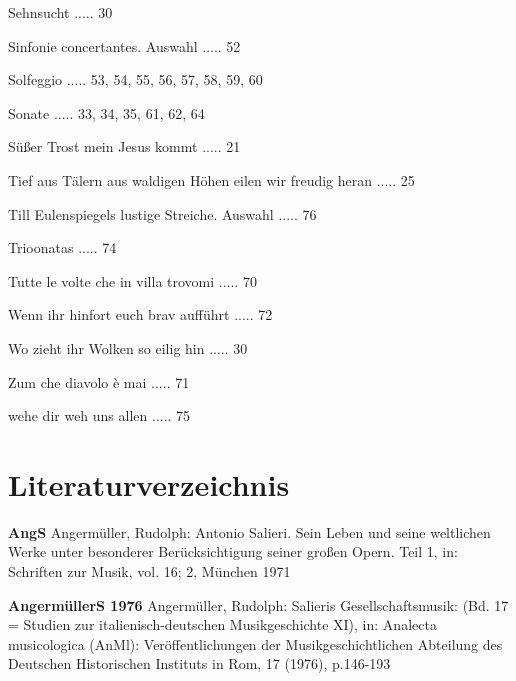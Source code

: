 \documentclass[a4paper, twocolumn, 11pt]{book}
\begin{document}
\newline 
Sehnsucht ..... 30

\newline 
Sinfonie concertantes. Auswahl ..... 52

\newline 
Solfeggio ..... 53, 54, 55, 56, 57, 58, 59, 60

\newline 
Sonate ..... 33, 34, 35, 61, 62, 64

\newline 
Süßer Trost mein Jesus kommt ..... 21

\newline 
Tief aus Tälern aus waldigen Höhen eilen wir freudig heran ..... 25

\newline 
Till Eulenspiegels lustige Streiche. Auswahl ..... 76

\newline 
Trioonatas ..... 74

\newline 
Tutte le volte che in villa trovomi ..... 70

\newline 
Wenn ihr hinfort euch brav aufführt ..... 72

\newline 
Wo zieht ihr Wolken so eilig hin ..... 30

\newline 
Zum che diavolo è mai ..... 71

\newline 
wehe dir weh uns allen ..... 75
    \clearpage 
    \onecolumn 
    \chapter*{\centering Literaturverzeichnis}
\fancyhead{}


  \textbf{AngS}\hspace{10pt}
  Angermüller, Rudolph: Antonio Salieri. Sein Leben und seine weltlichen Werke unter besonderer Berücksichtigung seiner {\textquotedbl}großen{\textquotedbl} Opern. Teil 1, in: Schriften zur Musik, vol. 16; 2, München 1971 \newline 


  \textbf{AngermüllerS 1976}\hspace{10pt}
  Angermüller, Rudolph: Salieris Gesellschaftsmusik: (Bd. 17 = Studien zur italienisch-deutschen Musikgeschichte XI), in: Analecta musicologica (AnMl): Veröffentlichungen der Musikgeschichtlichen Abteilung des Deutschen Historischen Instituts in Rom, 17 (1976), p.146-193 \newline 
\end{document}
